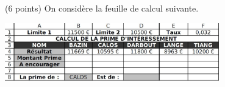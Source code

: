 \documentclass[a4paper]{article}
\newif\ifcorrection
\begin{document}
\begin{enumerate}
 \fi %
\end{enumerate}


\exost (6 points) On consid\`ere la feuille de calcul suivante.
\begin{center}
\includegraphics[width=0.7\textwidth]{exemple.jpg} 
\end{center}
\end{document}
